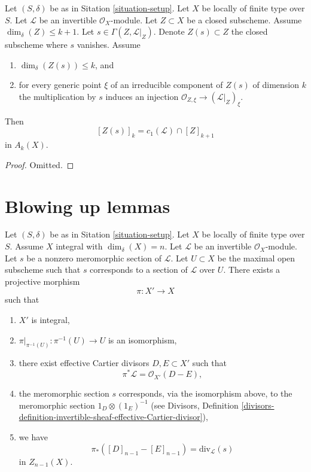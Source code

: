 \begin{lemma}
\label{lemma-geometric-cap}
Let $(S, \delta)$ be as in Sitation \ref{situation-setup}.
Let $X$ be locally of finite type over $S$.
Let $\mathcal{L}$ be an invertible $\mathcal{O}_X$-module.
Let $Z \subset X$ be a closed subscheme.
Assume $\dim_\delta(Z) \leq k + 1$.
Let $s \in \Gamma(Z, \mathcal{L}|_Z)$.
Denote $Z(s) \subset Z$ the closed subscheme where $s$ vanishes.
Assume
\begin{enumerate}
\item $\dim_\delta(Z(s)) \leq k$, and
\item for every generic point $\xi$ of an irreducible component of
$Z(s)$ of dimension $k$ the multiplication by $s$
induces an injection $\mathcal{O}_{Z, \xi} \to (\mathcal{L}|_Z)_\xi$.
\end{enumerate}
Then
$$
[Z(s)]_k = c_1(\mathcal{L}) \cap [Z]_{k + 1}
$$
in $A_k(X)$.
\end{lemma}

\begin{proof}
Omitted.
\end{proof}







\section{Blowing up lemmas}
\label{section-blowing-up-lemmas}


\begin{lemma}
\label{lemma-blowing-up-denominators}
Let $(S, \delta)$ be as in Sitation \ref{situation-setup}.
Let $X$ be locally of finite type over $S$.
Assume $X$ integral with $\dim_\delta(X) = n$.
Let $\mathcal{L}$ be an invertible $\mathcal{O}_X$-module.
Let $s$ be a nonzero meromorphic section of $\mathcal{L}$.
Let $U \subset X$ be the maximal open subscheme such that
$s$ corresponds to a section of $\mathcal{L}$ over $U$.
There exists a projective morphism
$$
\pi : X' \longrightarrow X
$$
such that
\begin{enumerate}
\item $X'$ is integral,
\item $\pi|_{\pi^{-1}(U)} : \pi^{-1}(U) \to U$ is an isomorphism,
\item there exist effective Cartier divisors $D, E \subset X'$
such that 
$$
\pi^*\mathcal{L} = \mathcal{O}_{X'}(D - E),
$$
\item the meromorphic section $s$ corresponds, via the isomorphism above,
to the meromorphic section $1_D \otimes (1_E)^{-1}$ (see Divisors,
Definition
\ref{divisors-definition-invertible-sheaf-effective-Cartier-divisor}),
\item we have
$$
\pi_*([D]_{n - 1} - [E]_{n - 1}) = \text{div}_{\mathcal{L}}(s)
$$
in $Z_{n - 1}(X)$.
\end{enumerate}
\end{lemma}

